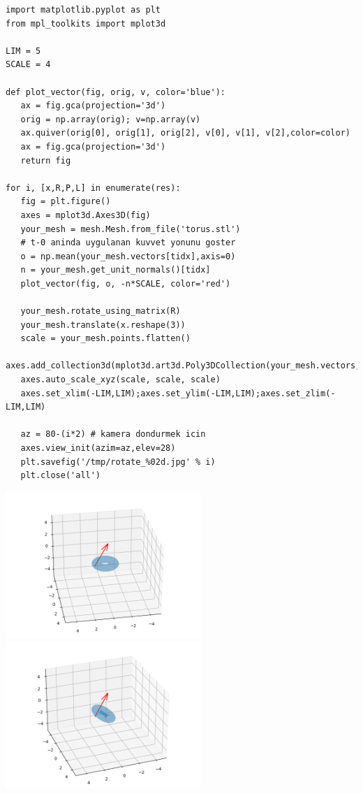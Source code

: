 \documentclass[12pt,fleqn]{article}\usepackage{../../common}
\begin{document}
\begin{verbatim}
import matplotlib.pyplot as plt
from mpl_toolkits import mplot3d

LIM = 5
SCALE = 4

def plot_vector(fig, orig, v, color='blue'):
   ax = fig.gca(projection='3d')
   orig = np.array(orig); v=np.array(v)
   ax.quiver(orig[0], orig[1], orig[2], v[0], v[1], v[2],color=color)
   ax = fig.gca(projection='3d')  
   return fig

for i, [x,R,P,L] in enumerate(res):
   fig = plt.figure()
   axes = mplot3d.Axes3D(fig)
   your_mesh = mesh.Mesh.from_file('torus.stl')
   # t-0 aninda uygulanan kuvvet yonunu goster
   o = np.mean(your_mesh.vectors[tidx],axis=0)
   n = your_mesh.get_unit_normals()[tidx]
   plot_vector(fig, o, -n*SCALE, color='red')
   
   your_mesh.rotate_using_matrix(R)
   your_mesh.translate(x.reshape(3))
   scale = your_mesh.points.flatten()
   axes.add_collection3d(mplot3d.art3d.Poly3DCollection(your_mesh.vectors,alpha=0.3))
   axes.auto_scale_xyz(scale, scale, scale)
   axes.set_xlim(-LIM,LIM);axes.set_ylim(-LIM,LIM);axes.set_zlim(-LIM,LIM)

   az = 80-(i*2) # kamera dondurmek icin
   axes.view_init(azim=az,elev=28)
   plt.savefig('/tmp/rotate_%02d.jpg' % i)
   plt.close('all')    
\end{verbatim}

\includegraphics[width=20em]{sim2/rotate_00.png}
\includegraphics[width=20em]{sim2/rotate_05.png}
\end{document}
